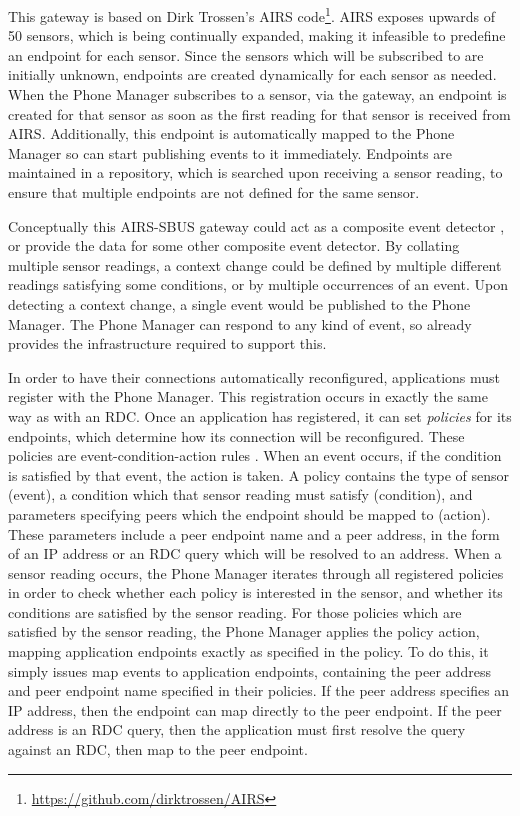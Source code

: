 \documentclass[12pt,twoside,notitlepage]{report}
\begin{document}
This gateway is based on Dirk Trossen's AIRS code\footnote{\url{https://github.com/dirktrossen/AIRS}}. 
AIRS exposes upwards of 50 sensors, which is being continually expanded, making it infeasible to predefine an endpoint for each sensor. 
Since the sensors which will be subscribed to are initially unknown, endpoints are created dynamically for each sensor as needed. 
When the Phone Manager subscribes to a sensor, via the gateway, an endpoint is created for that sensor as soon as the first reading for that sensor is received from AIRS. 
Additionally, this endpoint is automatically mapped to the Phone Manager so can start publishing events to it immediately. 
Endpoints are maintained in a repository, which is searched upon receiving a sensor reading, to ensure that multiple endpoints are not defined for the same sensor. 

Conceptually this AIRS-SBUS gateway could act as a composite event detector \cite{chakravarthy1994composite}, or provide the data for some other composite event detector. 
By collating multiple sensor readings, a context change could be defined by multiple different readings satisfying some conditions, or by multiple occurrences of an event.
Upon detecting a context change, a single event would be published to the Phone Manager. 
The Phone Manager can respond to any kind of event, so already provides the infrastructure required to support this.

In order to have their connections automatically reconfigured, applications must register with the Phone Manager. 
This registration occurs in exactly the same way as with an RDC. 
Once an application has registered, it can set {\sl policies} for its endpoints, which determine how its connection will be reconfigured. 
These policies are event-condition-action rules \cite{mccarthy1989architecture}. 
When an event occurs, if the condition is satisfied by that event, the action is taken. 
A policy contains the type of sensor (event), a condition which that sensor reading must satisfy (condition), and parameters specifying peers which the endpoint should be mapped to (action). 
These parameters include a peer endpoint name and a peer address, in the form of an IP address or an RDC query which will be resolved to an address. 
When a sensor reading occurs, the Phone Manager iterates through all registered policies in order to check whether each policy is interested in the sensor, and whether its conditions are satisfied by the sensor reading. 
For those policies which are satisfied by the sensor reading, the Phone Manager applies the policy action, mapping application endpoints exactly as specified in the policy. 
To do this, it simply issues map events to application endpoints, containing the peer address and peer endpoint name specified in their policies. 
If the peer address specifies an IP address, then the endpoint can map directly to the peer endpoint. 
If the peer address is an RDC query, then the application must first resolve the query against an RDC, then map to the peer endpoint. 
\end{document}
